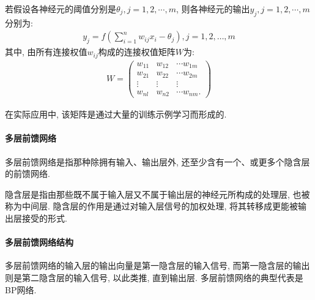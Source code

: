 若假设各神经元的阈值分别是$\theta_j, j=1,2,\cdots,m$, 则各神经元的输出$y_j, j=1,2,\cdots,m$分别为:
\begin{align}
  {y}_{{j}}={f}\left(\sum_{{i}=1}^{{n}} w_{{ij}} {x}_{{i}}-\theta_{{j}}\right), {j}=1,2, \ldots, {m}
\end{align}
其中, 由所有连接权值$w_{ij}$构成的连接权值矩阵$W$为:
\begin{align}
  W=\left(
  \begin{array}{lll}
  {w_{11}} & {w_{12}} & {\cdots w_{1 {m}}} \\ {w_{21}} & {w_{22}} & {\cdots w_{2 {m}}} \\
  {\vdots} & {\vdots} & {\vdots} \\ {w_{{nl}}} & {w_{{n} 2}} & {\cdots w_{{nm}}}.
  \end{array}
  \right)
\end{align}

在实际应用中, 该矩阵是通过大量的训练示例学习而形成的.
\paragraph{多层前馈网络}
多层前馈网络是指那种除拥有输入、输出层外, 还至少含有一个、或更多个隐含层的前馈网络.

隐含层是指由那些既不属于输入层又不属于输出层的神经元所构成的处理层, 也被称为中间层. 隐含层的作用是通过对输入层信号的加权处理, 将其转移成更能被输出层接受的形式.
\paragraph{多层前馈网络结构}

多层前馈网络的输入层的输出向量是第一隐含层的输入信号, 而第一隐含层的输出则是第二隐含层的输入信号, 以此类推, 直到输出层. 多层前馈网络的典型代表是BP网络.
